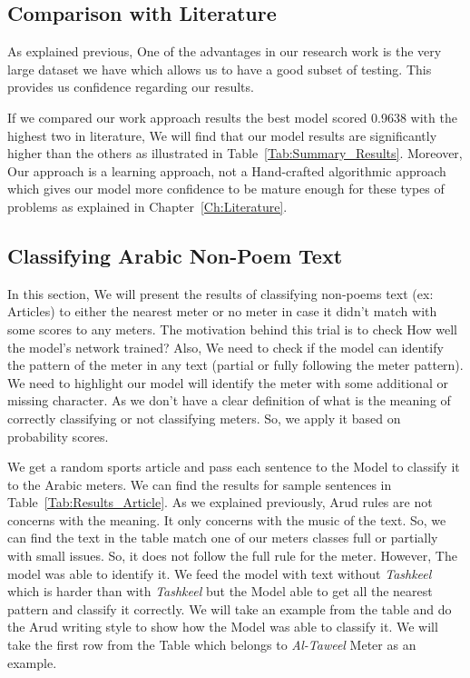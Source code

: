 \subsection{Comparison with Literature}
As explained previous, One of the advantages in our research work is the very large dataset we have which allows us to have a good subset of testing. This provides us confidence regarding our results.

If we compared our work approach results the best model scored 0.9638 with the highest two in literature, We will find that our model results are significantly higher than the others as illustrated in Table~\ref{Tab:Summary_Results}. Moreover, Our approach is a learning approach, not a Hand-crafted algorithmic approach which gives our model more confidence to be mature enough for these types of problems as explained in Chapter~\ref{Ch:Literature}.

\subsection{Classifying Arabic Non-Poem Text}

In this section, We will present the results of classifying non-poems text (ex: Articles) to either the nearest meter or no meter in case it didn’t match with some scores to any meters. The motivation behind this trial is to check How well the model’s network trained? Also, We need to check if the model can identify the pattern of the meter in any text (partial or fully following the meter pattern). We need to highlight our model will identify the meter with some additional or missing character. As we don’t have a clear definition of what is the meaning of correctly classifying or not classifying meters. So, we apply it based on probability scores.

We get a random sports article and pass each sentence to the Model to classify it to the Arabic meters. We can find the results for sample sentences in Table~\ref{Tab:Results_Article}. As we explained previously, Arud rules are not concerns with the meaning. It only concerns with the music of the text. So, we can find the text in the table match one of our meters classes full or partially with small issues. So, it does not follow the full rule for the meter. However, The model was able to identify it. We feed the model with text without \textit{Tashkeel} which is harder than with \textit{Tashkeel} but the Model able to get all the nearest pattern and classify it correctly. We will take an example from the table and do the Arud writing style to show how the Model was able to classify it. We will take the first row from the Table which belongs to \textit{Al-Taweel} Meter as an example.

